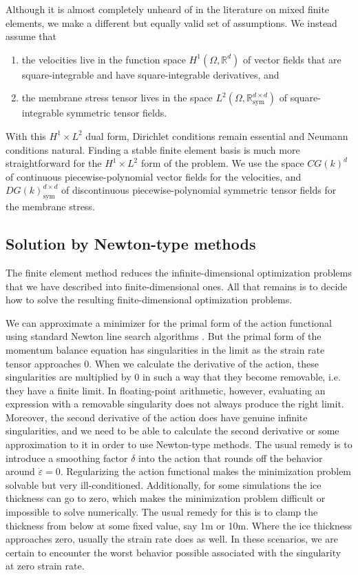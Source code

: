 \documentclass[twocolumn,letterpaper]{igs}
\begin{document}
Although it is almost completely unheard of in the literature on mixed finite elements, we make a different but equally valid set of assumptions.
We instead assume that
\begin{enumerate}
    \item the velocities live in the function space $H^1(\Omega, \mathbb{R}^d)$ of vector fields that are square-integrable and have square-integrable derivatives, and
    \item the membrane stress tensor lives in the space $L^2(\Omega, \mathbb{R}^{d \times d}_{\text{sym}})$ of square-integrable symmetric tensor fields.
\end{enumerate}
With this $H^1 \times L^2$ dual form, Dirichlet conditions remain essential and Neumann conditions natural.
Finding a stable finite element basis is much more straightforward for the $H^1\times L^2$ form of the problem.
We use the space $CG(k)^d$ of continuous piecewise-polynomial vector fields for the velocities, and $DG(k)^{d\times d}_{\text{sym}}$ of discontinuous piecewise-polynomial symmetric tensor fields for the membrane stress.



\subsection{Solution by Newton-type methods}
\label{app:solution}

The finite element method reduces the infinite-dimensional optimization problems that we have described into finite-dimensional ones.
All that remains is to decide how to solve the resulting finite-dimensional optimization problems.

We can approximate a minimizer for the primal form of the action functional using standard Newton line search algorithms \citep{shapero2021icepack}.
But the primal form of the momentum balance equation has singularities in the limit as the strain rate tensor approaches 0.
When we calculate the derivative of the action, these singularities are multiplied by 0 in such a way that they become removable, i.e. they have a finite limit.
In floating-point arithmetic, however, evaluating an expression with a removable singularity does not always produce the right limit.
Moreover, the second derivative of the action does have genuine infinite singularities, and we need to be able to calculate the second derivative or some approximation to it in order to use Newton-type methods.
The usual remedy is to introduce a smoothing factor $\delta$ into the action that rounds off the behavior around $\dot\varepsilon = 0$.
Regularizing the action functional makes the minimization problem solvable but very ill-conditioned.
Additionally, for some simulations the ice thickness can go to zero, which makes the minimization problem difficult or impossible to solve numerically.
The usual remedy for this is to clamp the thickness from below at some fixed value, say 1m or 10m.
Where the ice thickness approaches zero, usually the strain rate does as well.
In these scenarios, we are certain to encounter the worst behavior possible associated with the singularity at zero strain rate.
\end{document}
